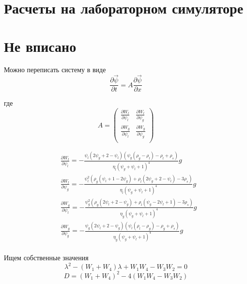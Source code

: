 \documentclass[12pt,a4paper]{article}
\newcommand{\pd}[2]{\frac{\partial #1}{\partial #2}}
\begin{document}
\section{Расчеты на лабораторном симуляторе}


\section{Не вписано}
Можно переписать систему в виде
\begin{equation}
\frac{\partial \vec\psi}{\partial t}  = A \frac{\partial \vec\psi}{\partial x}
\end{equation}

где
\begin{equation}
A = \begin{pmatrix}
 \frac{\partial W_l}{\partial \psi_l} &  \frac{\partial W_l}{\partial \psi_g} \\
 \frac{\partial W_g}{\partial \psi_l} &  \frac{\partial W_g}{\partial \psi_g} \\
\end{pmatrix}	
\end{equation}

\begin{equation}
\begin{aligned}
&\pd{W_l}{\psi_l} = -\frac{\psi_l (2 \psi_g + 2 - \psi_l) (\psi_g (\rho_g-\rho_l)-\rho_l+\rho_s)}{\eta_l (\psi_g+\psi_l+1)^4} g\\
&\pd{W_l}{\psi_g} = -\frac{\psi_l^2 (\rho_g (\psi_l + 1 - 2 \psi_g)+\rho_l (2 \psi_g + 2 - \psi_l)- 3 \rho_s)}{\eta_l (\psi_g + \psi_l + 1)^4}g\\
&\pd{W_g}{\psi_l} = -\frac{\psi_g^2(\rho_g (2\psi_l + 2 - \psi_g)+\rho_l (\psi_g - 2 \psi_l + 1) - 3 \rho_s)}{\eta_g (\psi_g + \psi_l + 1)^4}g\\
&\pd{W_g}{\psi_g} = -\frac{\psi_g (2\psi_l + 2 - \psi_g) (\psi_l (\rho_l -\rho_g) - \rho_g + \rho_s)}{\eta_g (\psi_g + \psi_l + 1)^4}g\\
\end{aligned}
\end{equation}

Ищем собственные значения
\begin{equation}
\lambda^2 - (W_1 + W_4)\lambda + W_1 W_4 - W_3 W_2 = 0	
\end{equation}
\begin{equation}
D = (W_1 + W_4)^2 - 4(W_1 W_4 - W_3 W_2)	
\end{equation}
\end{document}
